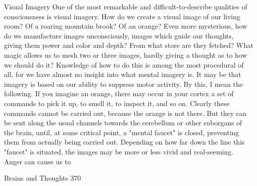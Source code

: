                                     Visual Imagery
One of the most remarkable and difficult-to-describe qualities of consciousness is visual
imagery. How do we create a visual image of our living room? Of a roaring mountain
brook? Of an orange? Even more mysterious, how do we manufacture images
unconsciously, images which guide our thoughts, giving them power and color and
depth? From what store are they fetched? What magic allows us to mesh two or three
images, hardly giving a thought as to how we should do it? Knowledge of how to do this
is among the most procedural of all, for we have almost no insight into what mental
imagery is.
         It may be that imagery is based on our ability to suppress motor activity. By this, I
mean the following. If you imagine an orange, there may occur in your cortex a set of
commands to pick it up, to smell it, to inspect it, and so on. Clearly these commands
cannot be carried out, because the orange is not there. But they can be sent along the
usual channels towards the cerebellum or other suborgans of the brain, until, at some
critical point, a "mental faucet" is closed, preventing them from actually being carried
out. Depending on how far down the line this "faucet" is situated, the images may be
more or less vivid and real-seeming. Anger can cause us to




Brains and Thoughts                                                                       370


